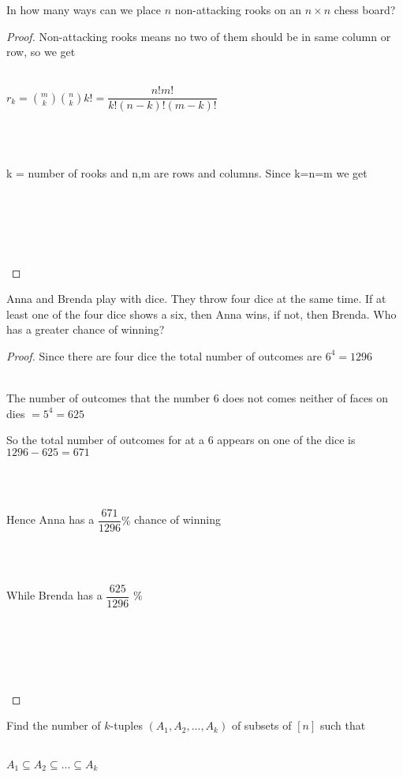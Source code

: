 \documentclass[12pt]{article}
\newenvironment{problem}[2][Problem]{\begin{trivlist}
\item[\hskip \labelsep {\bfseries #1}\hskip \labelsep {\bfseries #2.}]}{\end{trivlist}}
\begin{document}
\begin{problem}{11}
In how many ways can we place $n$ non-attacking rooks on an $n \times n$ chess board?
\end{problem}
 
 \begin{proof}
Non-attacking rooks means no two of them should be in same column or row, so we get \\ \\
\centerline{$r_k = {m \choose k } {n \choose k}k! = \dfrac{n!m!}{k!(n-k)!(m-k)!}$} \\ \\
\centerline{k = number of rooks and n,m are rows and columns. Since k=n=m we get} \\ \\
\centerline{} \\ \\

 \end{proof}
 
 \begin{problem}{12}
Anna and Brenda play with dice. They throw four dice at the same time. If at least one of the four dice shows a six, then Anna wins, if not, then Brenda. Who has a greater chance of winning?
 \end{problem}
 
 \begin{proof}
Since there are four dice the total number of outcomes are $6^4 = 1296$ \\ \\
\centerline{The number of outcomes that the number 6 does not comes neither of faces on dies $=5^4=625$}
\centerline{So the total number of outcomes for at a 6 appears on one of the dice is $1296-625=671$} \\ \\
\centerline{Hence Anna has a $\dfrac{671}{1296}\% $ chance of winning} \\ \\
\centerline{While Brenda has a $\dfrac{625}{1296}$ \%} \\ \\
\centerline{} \\ \\

 \end{proof}
 
 \begin{problem}{13}
Find the number of $k$-tuples $(A_1,A_2,...,A_k)$ of subsets of $[n]$ such that \\ \\
\centerline{$A_1 \subseteq A_2 \subseteq ... \subseteq A_k$}
 \end{problem}
 
\end{document}
